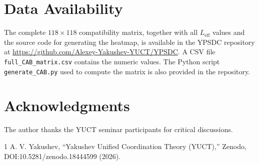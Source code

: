 \documentclass[11pt,a4paper]{article}
\begin{document}
	\section*{Data Availability}
	The complete \(118\times118\) compatibility matrix, together with all \(L_{\mathrm{eff}}\) values and the source code for generating the heatmap, is available in the YPSDC repository at \url{https://github.com/Alexey-Yakushev-YUCT/YPSDC}. A CSV file \texttt{full\_CAB\_matrix.csv} contains the numeric values. The Python script \texttt{generate\_CAB.py} used to compute the matrix is also provided in the repository.
	
	\section*{Acknowledgments}
	The author thanks the YUCT seminar participants for critical discussions.
	
	
	\begin{thebibliography}{1}
		 A. V. Yakushev, ``Yakushev Unified Coordination Theory (YUCT),'' Zenodo, DOI:10.5281/zenodo.18444599 (2026).
	\end{thebibliography}
	
\end{document}
